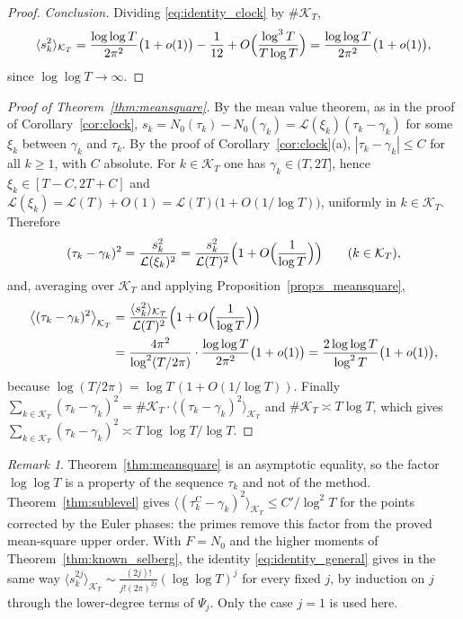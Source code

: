 \documentclass[11pt,a4paper]{article}
\makeatletter
\numberwithin{equation}{section}
\DeclareRobustCommand{\CGref}[1]{\ref{#1}}
\DeclareRobustCommand{\CGeqref}[1]{\eqref{#1}}
\let\CG@origref\ref
\let\CG@origeqref\eqref
\newcommand{\CG@gettip}[1]{\@ifundefined{CGTip@#1}{#1}{\csname CGTip@#1\endcsname}}
\DeclareRobustCommand{\CGref}[1]{\pdftooltip{\CG@origref{#1}}{\CG@gettip{#1}}}
\DeclareRobustCommand{\CGeqref}[1]{\pdftooltip{\CG@origeqref{#1}}{\CG@gettip{#1}}}
\theoremstyle{definition}
\theoremstyle{remark}
\newtheorem{remark}[theorem]{Remark}
\newcommand{\Nz}{N_0} %
\newcommand{\lL}{\mathcal L}
\newcommand{\Kc}{\mathcal K}
\makeatother
\begin{document}
\begin{proof}
\emph{Conclusion.} Dividing \CGeqref{eq:identity_clock} by $\#\Kc_T$,
\[
\langle s_k^2\rangle_{\Kc_T}=\frac{\log\log T}{2\pi^2}\bigl(1+o(1)\bigr)-\frac1{12}+O\Bigl(\frac{\log^3T}{T\log T}\Bigr)=\frac{\log\log T}{2\pi^2}\bigl(1+o(1)\bigr),
\]
since $\log\log T\to\infty$.
\end{proof}

\begin{proof}[Proof of Theorem~\ref{thm:meansquare}]
By the mean value theorem, as in the proof of Corollary~\CGref{cor:clock}, $s_k=\Nz(\tau_k)-\Nz(\gamma_k)=\lL(\xi_k)(\tau_k-\gamma_k)$ for some $\xi_k$ between $\gamma_k$ and $\tau_k$. By the proof of Corollary~\CGref{cor:clock}(a), $|\tau_k-\gamma_k|\le C$ for all $k\ge1$, with $C$ absolute. For $k\in\Kc_T$ one has $\gamma_k\in(T,2T]$, hence $\xi_k\in[T-C,2T+C]$ and $\lL(\xi_k)=\lL(T)+O(1)=\lL(T)\bigl(1+O(1/\log T)\bigr)$, uniformly in $k\in\Kc_T$. Therefore
\[
(\tau_k-\gamma_k)^2=\frac{s_k^2}{\lL(\xi_k)^2}=\frac{s_k^2}{\lL(T)^2}\Bigl(1+O\Bigl(\frac1{\log T}\Bigr)\Bigr)\qquad(k\in\Kc_T),
\]
and, averaging over $\Kc_T$ and applying Proposition~\CGref{prop:s_meansquare},
\[
\begin{aligned}
\bigl\langle(\tau_k-\gamma_k)^2\bigr\rangle_{\Kc_T}&=\frac{\langle s_k^2\rangle_{\Kc_T}}{\lL(T)^2}\Bigl(1+O\Bigl(\frac1{\log T}\Bigr)\Bigr)\\
&=\frac{4\pi^2}{\log^2(T/2\pi)}\cdot\frac{\log\log T}{2\pi^2}\bigl(1+o(1)\bigr)=\frac{2\log\log T}{\log^2T}\bigl(1+o(1)\bigr),
\end{aligned}
\]
because $\log(T/2\pi)=\log T\,(1+O(1/\log T))$. Finally $\sum_{k\in\Kc_T}(\tau_k-\gamma_k)^2=\#\Kc_T\cdot\langle(\tau_k-\gamma_k)^2\rangle_{\Kc_T}$ and $\#\Kc_T\asymp T\log T$, which gives $\sum_{k\in\Kc_T}(\tau_k-\gamma_k)^2\asymp T\log\log T/\log T$.
\end{proof}

\begin{remark}\label{rem:meansquare_comparison}
Theorem~\CGref{thm:meansquare} is an asymptotic equality, so the factor $\log\log T$ is a property of the sequence $\tau_k$ and not of the method. Theorem~\CGref{thm:sublevel} gives $\langle(\tau_{k}^{\mathrm C}-\gamma_k)^2\rangle_{\Kc_T}\le C'/\log^2T$ for the points corrected by the Euler phases: the primes remove this factor from the proved mean-square upper order. With $F=\Nz$ and the higher moments of Theorem~\CGref{thm:known_selberg}, the identity \CGeqref{eq:identity_general} gives in the same way $\langle s_k^{2j}\rangle_{\Kc_T}\sim\frac{(2j)!}{j!(2\pi)^{2j}}(\log\log T)^j$ for every fixed $j$, by induction on $j$ through the lower-degree terms of $\Psi_j$. Only the case $j=1$ is used here.
\end{remark}
\end{document}
